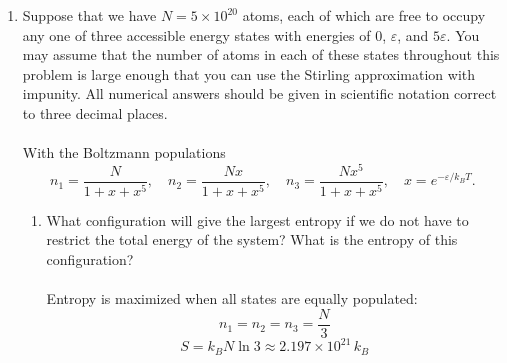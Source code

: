 \documentclass{article}
\begin{document}
\begin{enumerate}
\begin{enumerate}
            \item Determine the amount of energy, in electron-volts, that is freely available (so\ldots\ this is just the energy $k_BT$) at the following temperatures. Please give your answers as approximate fractions like $1/3$ eV.
            \\
            \\The thermal energy $k_BT$ at each temperature:
            \begin{enumerate}
                \item $T = 4$ K: $k_BT = (8.617\times10^{-5})(4) = 3.447\times10^{-4}$ eV $\approx \boxed{\dfrac{1}{2900}\text{ eV}}$
                \item $T = 77$ K: $k_BT = (8.617\times10^{-5})(77) = 6.635\times10^{-3}$ eV $\approx \boxed{\dfrac{1}{150}\text{ eV}}$
                \item $T = 300$ K: $k_BT = (8.617\times10^{-5})(300) = 2.585\times10^{-2}$ eV $\approx \boxed{\dfrac{1}{40}\text{ eV}}$
                \item $T = 5800$ K: $k_BT = (8.617\times10^{-5})(5800) = 0.4998$ eV $\approx \boxed{\dfrac{1}{2}\text{ eV}}$
            \end{enumerate}
        \end{enumerate}

        \item Suppose that we have $N = 5\times10^{20}$ atoms, each of which are free to occupy any one of three accessible energy states with energies of $0$, $\varepsilon$, and $5\varepsilon$. You may assume that the number of atoms in each of these states throughout this problem is large enough that you can use the Stirling approximation with impunity. All numerical answers should be given in scientific notation correct to three decimal places.
        \\
        \\With the Boltzmann populations
        \[n_1 = \frac{N}{1+x+x^5}, \quad n_2 = \frac{Nx}{1+x+x^5}, \quad n_3 = \frac{Nx^5}{1+x+x^5}, \quad x = e^{-\varepsilon/k_BT}.\]

        \begin{enumerate}
            \item What configuration will give the largest entropy if we do not have to restrict the total energy of the system? What is the entropy of this configuration?
            \\
            \\Entropy is maximized when all states are equally populated:
            \[n_1 = n_2 = n_3 = \frac{N}{3}\]
            \[S = k_B N\ln 3 \approx \boxed{2.197\times10^{21}\,k_B}\]


\end{enumerate}
\end{enumerate}
\end{document}
